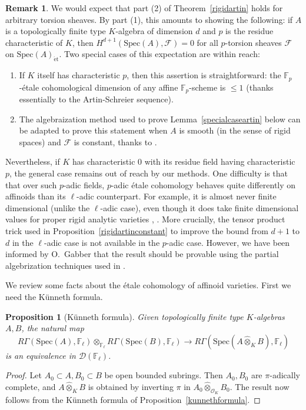 \documentclass[reqno]{amsart}
\newcommand{\sF}{\mathcal{F}}
\newcommand{\spec}{\mathrm{Spec}}
\newcommand{\et}{\mathrm{\acute{e}t}}
\newcommand{\D}{\mathcal{D}}
\newtheorem{proposition}[theorem]{Proposition}
\theoremstyle{definition}
\newtheorem{remark}[theorem]{Remark}
\begin{document}
\begin{remark} 
We would expect that part (2) of Theorem~\ref{rigidartin} holds for arbitrary torsion sheaves. By part (1), this amounts to showing the following: if $A$ is a topologically finite type $K$-algebra of dimension $d$ and $p$ is the residue characteristic of $K$, then $H^{d+1}(\spec(A), \sF) = 0$ for all $p$-torsion sheaves $\sF$ on $\spec(A)_{\et}$. Two special cases of this expectation are within reach: 
\begin{enumerate}
\item If $K$ itself has characteristic $p$, then this assertion is straightforward: the $\mathbb{F}_p$-\'etale cohomological dimension of any affine $\mathbb{F}_p$-scheme is $\leq 1$ (thanks essentially to the Artin-Schreier sequence). 
\item The algebraization method used to prove Lemma~\ref{specialcaseartin} below can be adapted to prove this statement when $A$ is smooth (in the sense of rigid spaces) and $\sF$ is constant, thanks to \cite[Theorem 7 and Remark 2 on page 587]{Elkik}.
\end{enumerate}
Nevertheless, if $K$ has characteristic $0$ with its residue field having
characteristic $p$, the general case remains out of reach by our methods. One difficulty is
that that over such $p$-adic fields, $p$-adic \'etale cohomology behaves quite
differently on affinoids than its $\ell$-adic counterpart. For example, it is
almost never finite dimensional (unlike the $\ell$-adic case), even though it
does take finite dimensional values for proper rigid analytic varieties
\cite{ScholzeRigid}, \cite[Theorem 3.17]{Scholzesurvey}. More crucially, the
tensor product trick used in Proposition~\ref{rigidartinconstant} to improve the
bound from $d+1$ to $d$ in the $\ell$-adic case is not available in the $p$-adic
case. However, we have been informed by O.~Gabber that the result should be
provable using the partial algebrization techniques used in \cite{GO}. 
\end{remark} 



We review some facts about the \'etale cohomology of affinoid varieties. 
First we need the K\"unneth formula. 

\begin{proposition}[K\"unneth formula]
\label{Kunnethaffinoid}
Given topologically finite type $K$-algebras $A, B$, the natural map
\[ R \Gamma( \spec(A) , \mathbb{F}_\ell) \otimes_{\mathbb{F}_\ell}  R \Gamma(
\spec(B), \mathbb{F}_\ell) \to R \Gamma( \spec(A \hat{\otimes}_K B),
\mathbb{F}_\ell) \]
is an equivalence in $\D(\mathbb{F}_\ell)$. 
\end{proposition} 
\begin{proof} 
Let $A_0 \subset A, B_0 \subset B$ be open bounded subrings. 
Then $A_0, B_0$ are $\pi$-adically complete, and  $A \hat{\otimes}_K B$ is obtained by inverting $\pi$ in $A_0 \widehat{\otimes}_{\mathcal{O}_K} B_0$. The result now follows from the K\"unneth formula of
Proposition~\ref{kunnethformula}. 
\end{proof} 
\end{document}
